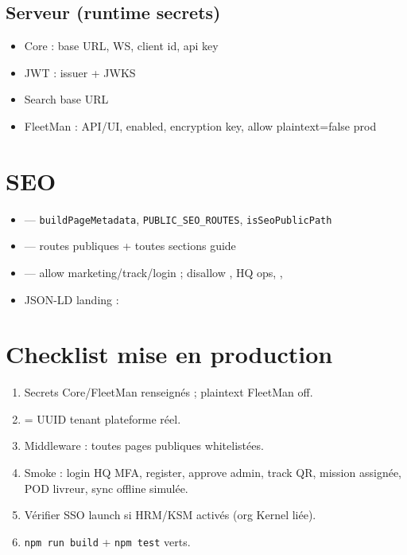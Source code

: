 \subsection{Serveur (runtime secrets)}

\begin{itemize}
  \item Core : base URL, WS, client id, api key
  \item JWT : issuer + JWKS
  \item Search base URL
  \item FleetMan : API/UI, enabled, encryption key, allow plaintext=false prod
\end{itemize}


\section{SEO}

\begin{itemize}
  \item {} --- \texttt{buildPageMetadata},
        \texttt{PUBLIC\_SEO\_ROUTES}, \texttt{isSeoPublicPath}
  \item {} --- routes publiques + toutes sections guide
  \item {} --- allow marketing/track/login ; disallow
        , HQ ops, , 
  \item JSON-LD landing : 
\end{itemize}

\section{Checklist mise en production}

\begin{enumerate}[leftmargin=*]
  \item Secrets Core/FleetMan renseignés ; plaintext FleetMan off.
  \item {} = UUID tenant plateforme réel.
  \item Middleware : toutes pages publiques whitelistées.
  \item Smoke : login HQ MFA, register, approve admin, track QR, mission
        assignée, POD livreur, sync offline simulée.
  \item Vérifier SSO launch si HRM/KSM activés (org Kernel liée).
  \item \texttt{npm run build} + \texttt{npm test} verts.
\end{enumerate}

